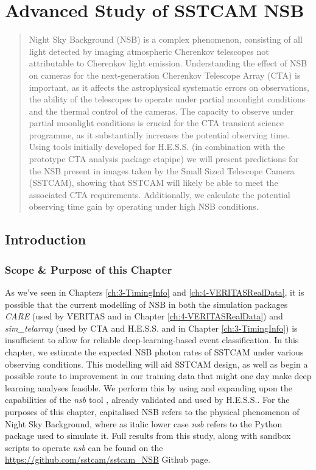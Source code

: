 \chapter{\label{ch:5-CHECNSB} Advanced Study of SSTCAM NSB}
\minitoc
\begin{abstract}
    Night Sky Background (NSB) is a complex phenomenon, consisting of all light detected by imaging atmospheric Cherenkov telescopes not attributable to Cherenkov light emission. Understanding the effect of NSB on cameras for the next-generation Cherenkov Telescope Array (CTA) is important, as it affects the astrophysical systematic errors on observations, the ability of the telescopes to operate under partial moonlight conditions and the thermal control of the cameras. The capacity to observe under partial moonlight conditions is crucial for the CTA transient science programme, as it substantially increases the potential observing time. Using tools initially developed for H.E.S.S. (in combination with the prototype CTA analysis package ctapipe) we will present predictions for the NSB present in images taken by the Small Sized Telescope Camera (SSTCAM), showing that SSTCAM will likely be able to meet the associated CTA requirements. Additionally, we calculate the potential observing time gain by operating under high NSB conditions.
\end{abstract}

\section{Introduction}
\label{sec:intro}

\subsection{Scope \& Purpose of this Chapter}
\label{sec:intro:scope}
As we've seen in Chapters \ref{ch:3-TimingInfo} and \ref{ch:4-VERITASRealData}, it is possible that the current modelling of NSB in both the simulation packages \textit{CARE} (used by VERITAS and in Chapter \ref{ch:4-VERITASRealData}) and \textit{sim\_telarray} (used by CTA and H.E.S.S. and in Chapter \ref{ch:3-TimingInfo}) is insufficient to allow for reliable deep-learning-based event classification. In this chapter, we estimate the expected NSB photon rates of SSTCAM under various observing conditions. This modelling will aid SSTCAM design, as well as begin a possible route to improvement in our training data that might one day make deep learning analyses feasible. We perform this by using and expanding upon the capabilities of the \textit{nsb} tool \cite{nsb}, already validated and used by H.E.S.S.. For the purposes of this chapter, capitalised NSB refers to the physical phenomenon of Night Sky Background, where as italic lower case \textit{nsb} refers to the Python package used to simulate it. Full results from this study, along with sandbox scripts to operate \textit{nsb} can be found on the \url{https://github.com/sstcam/sstcam_NSB} Github page. 

